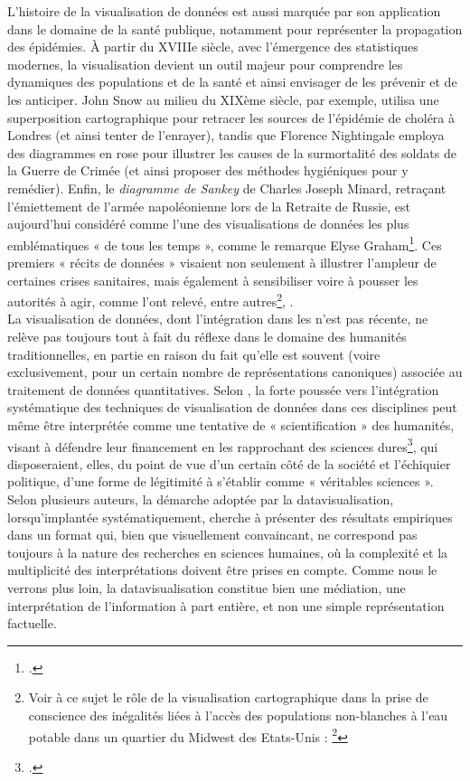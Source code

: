 L’histoire de la visualisation de données est aussi marquée par son application dans le domaine de la santé publique, notamment pour représenter la propagation des épidémies. À partir du XVIIIe siècle, avec l’émergence des statistiques modernes, la visualisation devient un outil majeur pour comprendre les dynamiques des populations et de la santé et ainsi envisager de les prévenir et de les anticiper. John Snow au milieu du XIXème siècle, par exemple, utilisa une superposition cartographique pour retracer les sources de l’épidémie de choléra à Londres (et ainsi tenter de l’enrayer), tandis que Florence Nightingale employa des diagrammes en rose pour illustrer les causes de la surmortalité des soldats de la Guerre de Crimée (et ainsi proposer des méthodes hygiéniques pour y remédier). Enfin, le \textit{diagramme de Sankey} de Charles Joseph Minard, retraçant l’émiettement de l’armée napoléonienne lors de la Retraite de Russie, est aujourd’hui considéré comme l’une des visualisations de données les plus emblématiques « de tous les temps », comme le remarque Elyse Graham\footcite[p.450]{graham_introduction_2017}.
Ces premiers « récits de données » visaient non seulement à illustrer l’ampleur de certaines crises sanitaires, mais également à sensibiliser voire à pousser les autorités à agir, comme l’ont relevé, entre autres\footnote{Voir à ce sujet le rôle de la visualisation cartographique dans la prise de conscience des inégalités liées à l’accès des populations non-blanches à l’eau potable dans un quartier du Midwest des Etats-Unis : \footcite{jeffries_how_2014}}, \citeauthor{shao_data_2024}.
\newline
{}\\

La visualisation de données, dont l’intégration dans les \shs n’est pas récente, ne relève pas toujours tout à fait du réflexe dans le domaine des humanités traditionnelles, en partie en raison du fait qu’elle est souvent (voire exclusivement, pour un certain nombre de représentations canoniques) associée au traitement de données quantitatives. Selon \citeauthor{pawlicka_data_2017}, la forte poussée vers l’intégration systématique des techniques de visualisation de données dans ces disciplines peut même être interprétée comme une tentative de « scientification » des humanités, visant à défendre leur financement en les rapprochant des sciences dures\footcite[p.526]{pawlicka_data_2017}, qui disposeraient, elles, du point de vue d’un certain côté de la société et l’échiquier politique, d’une forme de légitimité à s’établir comme « véritables sciences ». Selon plusieurs auteurs, la démarche adoptée par la datavisualisation, lorsqu’implantée systématiquement, cherche à présenter des résultats empiriques dans un format qui, bien que visuellement convaincant, ne correspond pas toujours à la nature des recherches en sciences humaines, où la complexité et la multiplicité des interprétations doivent être prises en compte. Comme nous le verrons plus loin, la datavisualisation constitue bien une médiation, une interprétation de l’information à part entière, et non une simple représentation factuelle.  

